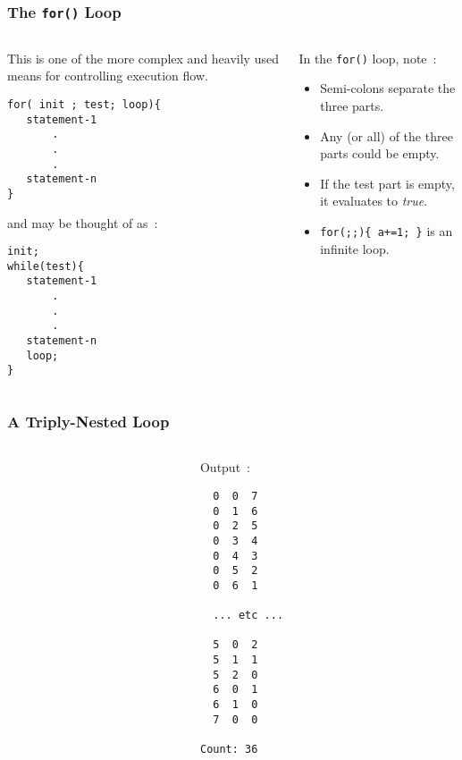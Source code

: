 \begin{frame}[fragile]
\frametitle{The {\tt for()} Loop}
\begin{columns}

\begin{column}{0.45\textwidth}
This is one of the more complex and heavily used means
for controlling execution flow.

\begin{lstlisting}[style=basicc,numbers=none]
for( init ; test; loop){
   statement-1
       .
       .
       .
   statement-n
}
\end{lstlisting}

and may be thought of as~:
\begin{lstlisting}[style=basicc,numbers=none]
init;
while(test){
   statement-1
       .
       .
       .
   statement-n
   loop;
}
\end{lstlisting}
\end{column}

\begin{column}{0.45\textwidth}
In the \verb^for()^ loop, note~:
\begin{itemize}[<+->]
\item Semi-colons separate the three parts.
\item Any (or all) of the three parts could be empty.
\item If the test part is empty, it evaluates to {\it true}.
\item \verb^for(;;){ a+=1; }^  is an infinite loop.
\end{itemize}
\end{column}

\end{columns}
\end{frame}

\begin{frame}[fragile]
\frametitle{A Triply-Nested Loop}

\begin{columns}
\begin{column}{0.55\textwidth}

\end{column}

\begin{column}{0.40\textwidth}
Output~:
{\scriptsize
\begin{verbatim}
  0  0  7
  0  1  6
  0  2  5
  0  3  4
  0  4  3
  0  5  2
  0  6  1
  
  ... etc ...

  5  0  2
  5  1  1
  5  2  0
  6  0  1
  6  1  0
  7  0  0

Count: 36
\end{verbatim}
}
\end{column}

\end{columns}
\end{frame}

